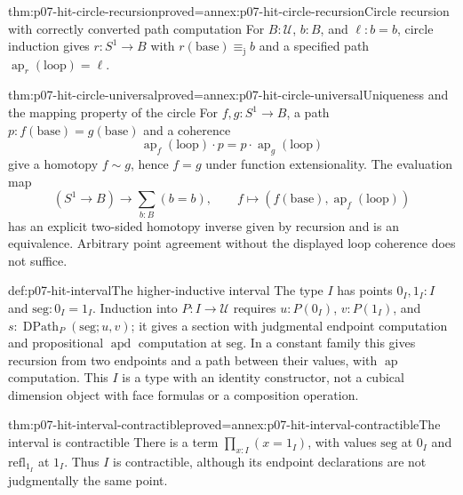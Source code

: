\begin{hbtheorem}{thm:p07-hit-circle-recursion}{proved=annex:p07-hit-circle-recursion}{Circle recursion with correctly converted path computation}
For \(B:\mathcal U\), \(b:B\), and \(\ell:b=b\), circle induction
gives \(r:S^1\to B\) with
\(r(\mathrm{base})\equiv_{\mathrm j}b\) and a specified path
\(\operatorname{ap}_r(\mathrm{loop})=\ell\).
\end{hbtheorem}

\begin{hbtheorem}{thm:p07-hit-circle-universal}{proved=annex:p07-hit-circle-universal}{Uniqueness and the mapping property of the circle}
For \(f,g:S^1\to B\), a path \(p:f(\mathrm{base})=g(\mathrm{base})\)
and a coherence
\[
 \operatorname{ap}_f(\mathrm{loop})\cdot p
            =p\cdot\operatorname{ap}_g(\mathrm{loop})
\]
give a homotopy \(f\sim g\), hence \(f=g\) under function extensionality.
The evaluation map
\[
 (S^1\to B)\longrightarrow\sum_{b:B}(b=b),\qquad
 f\longmapsto(f(\mathrm{base}),\operatorname{ap}_f(\mathrm{loop}))
\]
has an explicit two-sided homotopy inverse given by recursion and is an
equivalence. Arbitrary point agreement without the displayed loop coherence
does not suffice.
\end{hbtheorem}

\begin{hbdefinition}{def:p07-hit-interval}{The higher-inductive interval}
The type \(I\) has points \(0_I,1_I:I\) and
\(\mathrm{seg}:0_I=1_I\). Induction into \(P:I\to\mathcal U\)
requires \(u:P(0_I)\), \(v:P(1_I)\), and
\(s:\operatorname{DPath}_P(\mathrm{seg};u,v)\); it gives a section
with judgmental endpoint computation and propositional \(\operatorname{apd}\)
computation at \(\mathrm{seg}\). In a constant family this gives recursion
from two endpoints and a path between their values, with \(\operatorname{ap}\)
computation. This \(I\) is a type with an identity constructor, not a
cubical dimension object with face formulas or a composition operation.
\end{hbdefinition}

\begin{hbtheorem}{thm:p07-hit-interval-contractible}{proved=annex:p07-hit-interval-contractible}{The interval is contractible}
There is a term \(\prod_{x:I}(x=1_I)\), with values \(\mathrm{seg}\)
at \(0_I\) and \(\mathrm{refl}_{1_I}\) at \(1_I\). Thus \(I\)
is contractible, although its endpoint declarations are not judgmentally the
same point.
\end{hbtheorem}

